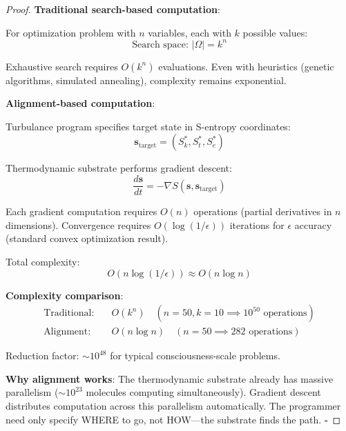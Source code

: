\begin{proof}
\textbf{Traditional search-based computation}:

For optimization problem with $n$ variables, each with $k$ possible values:
\begin{equation}
\text{Search space: } |\Omega| = k^n
\end{equation}

Exhaustive search requires $O(k^n)$ evaluations. Even with heuristics (genetic algorithms, simulated annealing), complexity remains exponential.

\textbf{Alignment-based computation}:

Turbulance program specifies target state in S-entropy coordinates:
\begin{equation}
\mathbf{s}_{\text{target}} = (S_k^*, S_t^*, S_e^*)
\end{equation}

Thermodynamic substrate performs gradient descent:
\begin{equation}
\frac{d\mathbf{s}}{dt} = -\nabla S(\mathbf{s}, \mathbf{s}_{\text{target}})
\end{equation}

Each gradient computation requires $O(n)$ operations (partial derivatives in $n$ dimensions). Convergence requires $O(\log(1/\epsilon))$ iterations for $\epsilon$ accuracy (standard convex optimization result).

Total complexity:
\begin{equation}
O(n \log(1/\epsilon)) \approx O(n \log n)
\end{equation}

\textbf{Complexity comparison}:
\begin{align}
\text{Traditional:} \quad &O(k^n) \quad (n = 50, k = 10 \implies 10^{50} \text{ operations}) \\
\text{Alignment:} \quad &O(n \log n) \quad (n = 50 \implies 282 \text{ operations})
\end{align}

Reduction factor: $\sim 10^{48}$ for typical consciousness-scale problems.

\textbf{Why alignment works}: The thermodynamic substrate already has massive parallelism ($\sim 10^{23}$ molecules computing simultaneously). Gradient descent distributes computation across this parallelism automatically. The programmer need only specify WHERE to go, not HOW—the substrate finds the path. $\square$
\end{proof}

